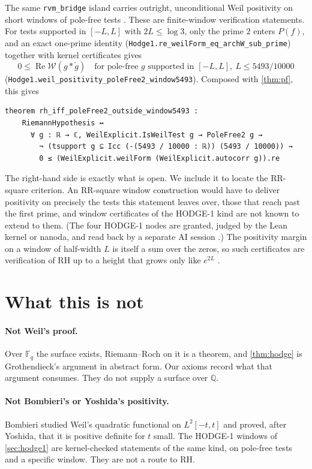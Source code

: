 \documentclass[11pt]{article}
\theoremstyle{definition}
\newcommand{\lean}[1]{\texttt{#1}}
\newcommand{\re}{\operatorname{Re}}
\newcommand{\Q}{\mathbb{Q}}
\newcommand{\F}{\mathbb{F}}
\newcommand{\Weil}{\mathcal{W}}
\begin{document}
The same \lean{rvm\_bridge} island carries outright, unconditional Weil positivity on short windows of pole-free tests \cite{Arda,RHLean}. These are finite-window verification statements. For tests supported in $[-L, L]$ with $2L \le \log 3$, only the prime $2$ enters $P(f)$, and an exact one-prime identity (\lean{Hodge1.re\_weilForm\_eq\_archW\_sub\_prime}) together with kernel certificates gives
\[
0 \le \re\Weil(g*\tilde g)\quad\text{for pole-free } g \text{ supported in } [-L,L],\ L \le 5493/10000
\]
(\lean{Hodge1.weil\_positivity\_poleFree2\_window5493}). Composed with \cref{thm:pf}, this gives
\begin{lstlisting}
theorem rh_iff_poleFree2_outside_window5493 :
    RiemannHypothesis ↔
      ∀ g : ℝ → ℂ, WeilExplicit.IsWeilTest g → PoleFree2 g →
        ¬ (tsupport g ⊆ Icc (-(5493 / 10000 : ℝ)) (5493 / 10000)) →
        0 ≤ (WeilExplicit.weilForm (WeilExplicit.autocorr g)).re
\end{lstlisting}
The right-hand side is exactly what is open. We include it to locate the RR-square criterion. An RR-square window construction would have to deliver positivity on precisely the tests this statement leaves over, those that reach past the first prime, and window certificates of the HODGE-1 kind are not known to extend to them. (The four HODGE-1 nodes are granted, judged by the Lean kernel or nanoda, and read back by a separate AI session \cite{RHLean}.) The positivity margin on a window of half-width $L$ is itself a sum over the zeros, so such certificates are verification of RH up to a height that grows only like $e^{2L}$ \cite{RHLean}.

\section{What this is not}\label{sec:not}

\paragraph{Not Weil's proof.} Over $\F_q$ the surface exists, Riemann--Roch on it is a theorem, and \cref{thm:hodge} is Grothendieck's argument \cite{Groth} in abstract form. Our axioms record what that argument consumes. They do not supply a surface over $\Q$.

\paragraph{Not Bombieri's or Yoshida's positivity.} Bombieri \cite{Bombieri} studied Weil's quadratic functional on $L^2[-t,t]$ and proved, after Yoshida, that it is positive definite for $t$ small. The HODGE-1 windows of \cref{sec:hodge1} are kernel-checked statements of the same kind, on pole-free tests and a specific window. They are not a route to RH.
\end{document}
